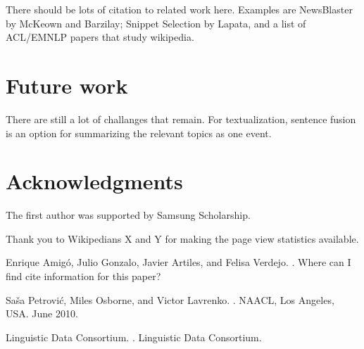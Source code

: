 \documentclass[11pt]{article}
\begin{document}
There should be lots of citation to related work here. Examples are NewsBlaster by McKeown and Barzilay; Snippet Selection by Lapata, and a list of ACL/EMNLP papers that study wikipedia.

\section{Future work}

There are still a lot of challanges that remain. For textualization, sentence fusion is an option for summarizing the relevant topics as one event.

\section*{Acknowledgments}

The first author was supported by Samsung Scholarship.

Thank you to Wikipedians X and Y for making the page view statistics available.

\begin{thebibliography}{}

Enrique Amig\'{o}, Julio Gonzalo, Javier Artiles, and Felisa Verdejo.
.
\newblock Where can I find cite information for this paper?

Sa\v{s}a Petrovi\'{c}, Miles Osborne, and Victor Lavrenko.
.
\newblock NAACL, Los Angeles, USA. June 2010.

{Linguistic Data Consortium}.
.
\newblock Linguistic Data Consortium.

\end{thebibliography}
\end{document}
